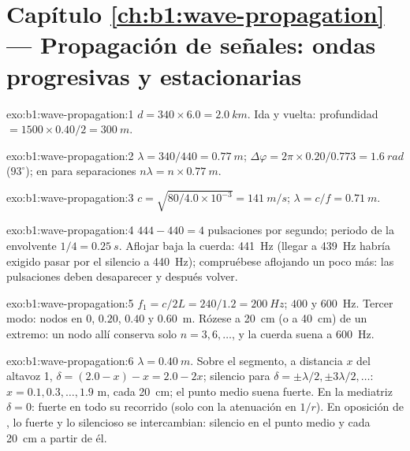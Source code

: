 \section*{Capítulo \ref{ch:b1:wave-propagation} --- Propagación de señales: ondas progresivas y estacionarias}

\begin{solution}{exo:b1:wave-propagation:1}
$d = 340 \times 6.0 = \qty{2.0}{km}$. Ida y vuelta: profundidad $= 1500 \times
0.40/2 = \qty{300}{m}$.
\end{solution}

\begin{solution}{exo:b1:wave-propagation:2}
$\lambda = 340/440 = \qty{0.77}{m}$; $\Delta\varphi = 2\pi \times
0.20/0.773 = \qty{1.6}{rad}$ ($93^\circ$); en  para separaciones
$n\lambda = n \times \qty{0.77}{m}$.
\end{solution}

\begin{solution}{exo:b1:wave-propagation:3}
$c = \sqrt{80/4.0\times10^{-3}} = \qty{141}{m/s}$; $\lambda = c/f =
\qty{0.71}{m}$.
\end{solution}

\begin{solution}{exo:b1:wave-propagation:4}
$444 - 440 = 4$ pulsaciones por segundo; periodo de la envolvente
$1/4 = \qty{0.25}{s}$. Aflojar baja la cuerda: \qty{441}{Hz} (llegar a
\qty{439}{Hz} habría exigido pasar por el silencio a \qty{440}{Hz});
compruébese aflojando un poco más: las pulsaciones deben desaparecer y
después volver.
\end{solution}

\begin{solution}{exo:b1:wave-propagation:5}
$f_1 = c/2L = 240/1.2 = \qty{200}{Hz}$; $400$ y \qty{600}{Hz}. Tercer
modo: nodos en $0$, $0.20$, $0.40$ y \qty{0.60}{m}. Rózese a \qty{20}{cm}
(o a \qty{40}{cm}) de un extremo: un nodo allí conserva solo
$n = 3, 6, \dots$, y la cuerda suena a \qty{600}{Hz}.
\end{solution}

\begin{solution}{exo:b1:wave-propagation:6}
$\lambda = \qty{0.40}{m}$. Sobre el segmento, a distancia $x$ del altavoz
1, $\delta = (2.0 - x) - x = 2.0 - 2x$; silencio para $\delta = \pm\lambda/2,
\pm 3\lambda/2, \dots$: $x = 0.1, 0.3, \dots, 1.9$ m, cada \qty{20}{cm};
el punto medio suena fuerte. En la mediatriz $\delta = 0$: fuerte en todo
su recorrido (solo con la atenuación en $1/r$). En oposición de , lo
fuerte y lo silencioso se intercambian: silencio en el punto medio y cada
\qty{20}{cm} a partir de él.
\end{solution}


